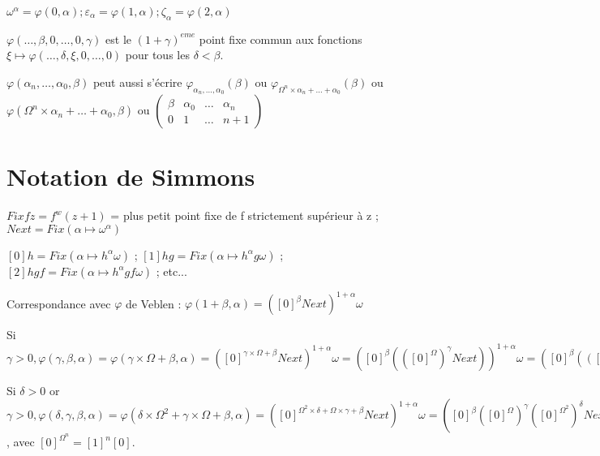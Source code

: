 \documentclass[8pt]{article}
\begin{document}
\( \omega^\alpha = \varphi(0,\alpha) ; \varepsilon_\alpha = \varphi(1,\alpha) ; \zeta_\alpha = \varphi(2,\alpha) \)

\(\varphi(\ldots,\beta,0,\ldots,0,\gamma) \) est le \((1+\gamma)^{eme}\) point fixe commun aux fonctions \( \xi \mapsto \varphi(\ldots,\delta,\xi,0,\ldots,0)\) pour tous les \(\delta < \beta\).

\vspace{-0.2cm}

\( \varphi(\alpha_n,\ldots,\alpha_0,\beta) \) peut aussi s'écrire \( \varphi_{\alpha_n,\ldots,\alpha_0}(\beta) \) ou \( \varphi_{\Omega^n\times\alpha_n+\ldots+\alpha_0}(\beta) \) ou \( \varphi(\Omega^n\times\alpha_n+\ldots+\alpha_0,\beta) \) ou \(
\begin{pmatrix}
    \beta & \alpha_0 & \ldots & \alpha_n \\
    0     & 1        & \ldots & n+1
\end{pmatrix} \)

\vspace{-0.8cm}


\section{Notation de Simmons}
\vspace{-0.4cm}
\( Fix f z = f^w(z+1)\) = plus petit point fixe de f strictement supérieur à z ; \( Next = Fix (\alpha \mapsto \omega^\alpha) \)

\( [0] h = Fix (\alpha \mapsto h^\alpha \omega) \) ;
\( [1] h g = Fix (\alpha \mapsto h^\alpha g \omega) \) ;
\( [2] h g f = Fix (\alpha \mapsto h^\alpha g f \omega) \) ; etc...

Correspondance avec \(\varphi\) de Veblen : \( \varphi(1+\beta,\alpha) = ([0]^\beta Next)^{1+\alpha} \omega \)

Si \( \gamma > 0 , \varphi(\gamma,\beta,\alpha) = \varphi(\gamma\times\Omega+\beta,\alpha) = ([0]^{\gamma\times\Omega+\beta} Next)^{1+\alpha} \omega = ([0]^\beta (([0]^\Omega)^\gamma Next))^{1+\alpha} \omega = ([0]^\beta (([1] [0])^\gamma Next))^{1+\alpha} \omega \)

Si \( \delta > 0 \) or \( \gamma > 0, \varphi(\delta,\gamma,\beta,\alpha) = \varphi(\delta\times\Omega^2+\gamma\times\Omega+\beta,\alpha) = ([0]^{\Omega^2\times\delta+\Omega\times\gamma+\beta} Next)^{1+\alpha} \omega = ([0]^\beta ([0]^\Omega)^\gamma ([0]^{\Omega^2})^\delta Next)))^{1+\alpha} \omega = ([0]^\beta (([1] [0])^\gamma (([1]^2 [0])^\delta Next)))^{1+\alpha} \omega \), avec \( [0]^{\Omega^n} = [1]^n [0] \).
\end{document}
